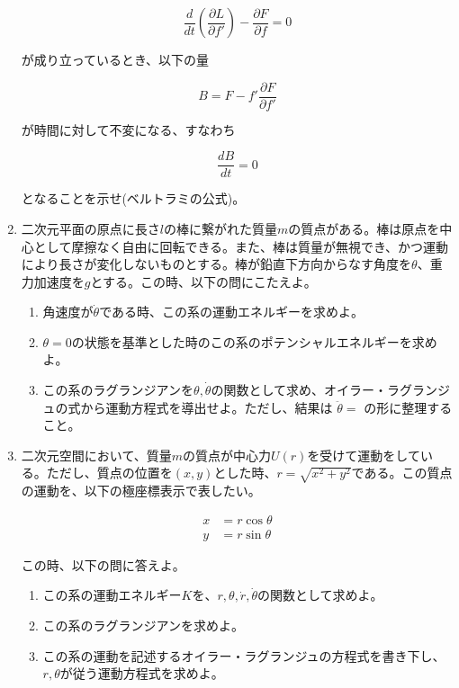 \documentclass{jsarticle}
\begin{document}
\begin{enumerate}
          $$
              \frac{d}{dt} \left(\frac{\partial L}{\partial f'} \right)
              - \frac{\partial F}{\partial f} = 0
          $$

          が成り立っているとき、以下の量

          $$
              B = F - f' \frac{\partial F}{\partial f'}
          $$

          が時間に対して不変になる、すなわち

          $$
              \frac{dB}{dt} = 0
          $$

          となることを示せ(ベルトラミの公式)。

          \newpage

    \item 二次元平面の原点に長さ$l$の棒に繋がれた質量$m$の質点がある。棒は原点を中心として摩擦なく自由に回転できる。また、棒は質量が無視でき、かつ運動により長さが変化しないものとする。棒が鉛直下方向からなす角度を$\theta$、重力加速度を$g$とする。この時、以下の問にこたえよ。
          \begin{enumerate}

              \item 角速度が$\dot{\theta}$である時、この系の運動エネルギーを求めよ。
              \item $\theta=0$の状態を基準とした時のこの系のポテンシャルエネルギーを求めよ。
              \item この系のラグランジアンを$\theta, \dot{\theta}$の関数として求め、オイラー・ラグランジュの式から運動方程式を導出せよ。ただし、結果は $\ddot{\theta} = $ の形に整理すること。
          \end{enumerate}

    \item 二次元空間において、質量$m$の質点が中心力$U(r)$を受けて運動をしている。ただし、質点の位置を$(x,y)$とした時、$r=\sqrt{x^2+y^2}$である。この質点の運動を、以下の極座標表示で表したい。

          $$
              \begin{aligned}
                  x & = r\cos \theta \\
                  y & = r\sin \theta
              \end{aligned}
          $$

          この時、以下の問に答えよ。
          \begin{enumerate}
              \item この系の運動エネルギー$K$を、$r, \theta, \dot{r}, \dot{\theta}$の関数として求めよ。
              \item この系のラグランジアンを求めよ。
              \item この系の運動を記述するオイラー・ラグランジュの方程式を書き下し、$r, \theta$が従う運動方程式を求めよ。

          \end{enumerate}

\end{enumerate}
\end{document}
